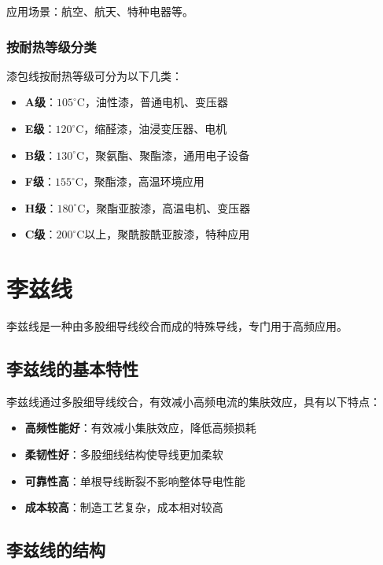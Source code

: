 \documentclass[12pt,UTF8]{ctexbook}
\begin{document}
应用场景：航空、航天、特种电器等。

\subsubsection{按耐热等级分类}

漆包线按耐热等级可分为以下几类：

\begin{itemize}[leftmargin=3.5em]
    \item \textbf{A级}：$105^\circ$C，油性漆，普通电机、变压器
    \item \textbf{E级}：$120^\circ$C，缩醛漆，油浸变压器、电机
    \item \textbf{B级}：$130^\circ$C，聚氨酯、聚酯漆，通用电子设备
    \item \textbf{F级}：$155^\circ$C，聚酯漆，高温环境应用
    \item \textbf{H级}：$180^\circ$C，聚酯亚胺漆，高温电机、变压器
    \item \textbf{C级}：$200^\circ$C以上，聚酰胺酰亚胺漆，特种应用
\end{itemize}

\section{李兹线}

李兹线是一种由多股细导线绞合而成的特殊导线，专门用于高频应用。

\subsection{李兹线的基本特性}

李兹线通过多股细导线绞合，有效减小高频电流的集肤效应，具有以下特点：

\begin{itemize}[leftmargin=3.5em]
    \item \textbf{高频性能好}：有效减小集肤效应，降低高频损耗
    \item \textbf{柔韧性好}：多股细线结构使导线更加柔软
    \item \textbf{可靠性高}：单根导线断裂不影响整体导电性能
    \item \textbf{成本较高}：制造工艺复杂，成本相对较高
\end{itemize}

\subsection{李兹线的结构}
\end{document}

